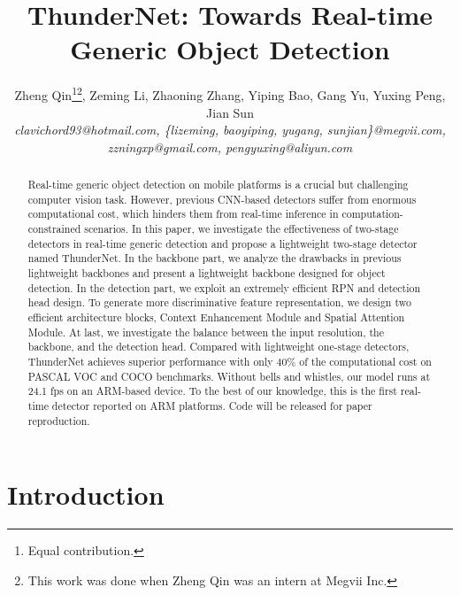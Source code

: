 \documentclass[10pt,twocolumn,letterpaper]{article}
\begin{document}
\title{ThunderNet: Towards Real-time Generic Object Detection}

\author{Zheng Qin\thanks{Equal contribution.}\hspace{4pt}\thanks{This work was done when Zheng Qin was an intern at Megvii Inc.}\hspace{4pt}, Zeming Li\footnotemark[1]\hspace{4pt}, Zhaoning Zhang, Yiping Bao, Gang Yu, Yuxing Peng, Jian Sun\\
{\small \textit{clavichord93@hotmail.com, \{lizeming, baoyiping, yugang, sunjian\}@megvii.com, zzningxp@gmail.com, pengyuxing@aliyun.com}}
}



\maketitle



\begin{abstract}
Real-time generic object detection on mobile platforms is a crucial but challenging computer vision task.
However, previous CNN-based detectors suffer from enormous computational cost, which hinders them from real-time inference in computation-constrained scenarios.
In this paper, we investigate the effectiveness of two-stage detectors in real-time generic detection and propose a lightweight two-stage detector named ThunderNet.
In the backbone part, we analyze the drawbacks in previous lightweight backbones and present a lightweight backbone designed for object detection.
In the detection part, we exploit an extremely efficient RPN and detection head design.
To generate more discriminative feature representation, we design two efficient architecture blocks, Context Enhancement Module and Spatial Attention Module.
At last, we investigate the balance between the input resolution, the backbone, and the detection head.
Compared with lightweight one-stage detectors, ThunderNet achieves superior performance with only 40\% of the computational cost on PASCAL VOC and COCO benchmarks.
Without bells and whistles, our model runs at 24.1 fps on an ARM-based device.
To the best of our knowledge, this is the first real-time detector reported on ARM platforms.
Code will be released for paper reproduction.
\end{abstract}

\section{Introduction}
\label{section:introduction}
\end{document}

